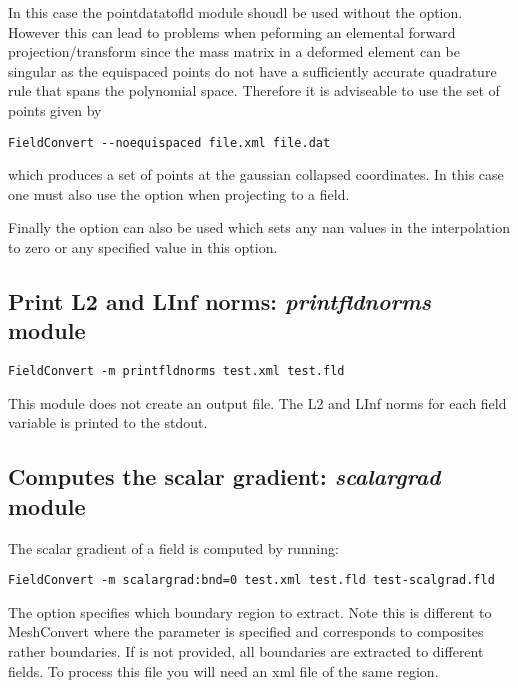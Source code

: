 In this case the pointdatatofld module shoudl be used without the
 option. However this can lead to problems when
peforming an elemental forward projection/transform since the mass
matrix in a deformed element can be singular as the equispaced points
do not have a sufficiently accurate quadrature rule that spans the
polynomial space. Therefore it is adviseable to use the set of points
given by

\begin{lstlisting}[style=BashInputStyle]
FieldConvert --noequispaced file.xml file.dat
\end{lstlisting}

which produces a set of points at the gaussian collapsed
coordinates. In this case one must also use the 
option when projecting to a field.

Finally the option  can also be used which sets
any nan values in the interpolation to zero or any specified value in
this option.

%
%
%

\subsection{Print L2 and LInf norms: \textit{printfldnorms} module}

\begin{lstlisting}[style=BashInputStyle] 
FieldConvert -m printfldnorms test.xml test.fld 
\end{lstlisting}

This module does not create an output file. The L2 and LInf norms for
each field variable is printed to the stdout.

%
%
%

\subsection{Computes the scalar gradient: \textit{scalargrad} module}
The scalar gradient of a field is computed by running:
\begin{lstlisting}[style=BashInputStyle] 
FieldConvert -m scalargrad:bnd=0 test.xml test.fld test-scalgrad.fld
\end{lstlisting}
The option  specifies which boundary region to extract. Note this is different to MeshConvert where the parameter  is specified and corresponds to composites rather boundaries. If  is not provided, all boundaries are extracted to different fields. To process this file you will need an xml file of the same region. 

